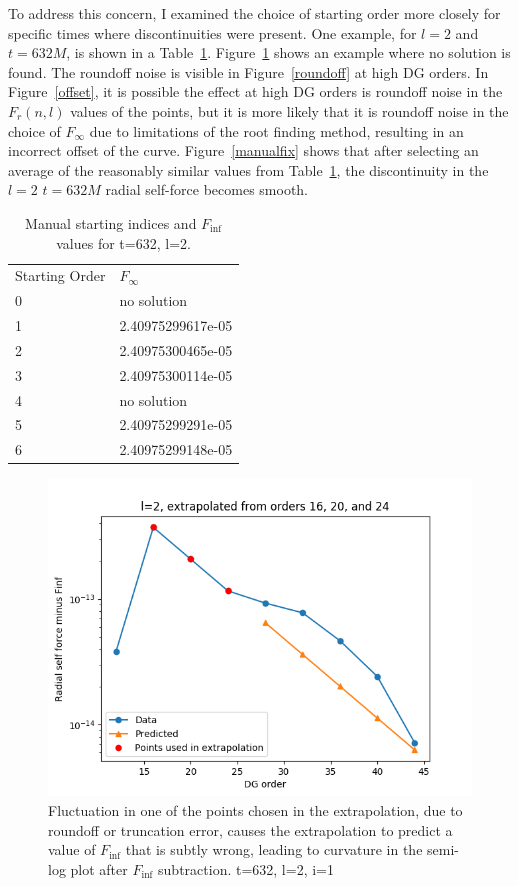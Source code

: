 To address this concern, I examined the choice of starting order more closely for specific times where discontinuities were present. One example, for $l=2$ and $t=632M$, is shown in a Table~\ref{manual}. Figure~\ref{nosoln} shows an example where no solution is found. The roundoff noise is visible in Figure~\ref{roundoff} at high DG orders. In Figure~\ref{offset}, it is possible the effect at high DG orders is roundoff noise in the $F_r(n,l)$ values of the points, but it is more likely that it is roundoff noise in the choice of $F_\infty$ due to limitations of the root finding method, resulting in an incorrect offset of the curve. Figure~\ref{manualfix} shows that after selecting an average of the reasonably similar values from Table~\ref{manual}, the discontinuity in the $l=2$ $t=632M$ radial self-force becomes smooth. 


\begin{table}
  \begin{tabular}{ll}
    Starting Order & $F_\infty$\\
    0 & no solution\\
    1 & 2.40975299617e-05\\
    2 & 2.40975300465e-05\\
    3 & 2.40975300114e-05\\
    4 & no solution\\
    5 & 2.40975299291e-05\\
    6 & 2.40975299148e-05\\
  \end{tabular}
  \caption{Manual starting indices and $F_{\inf}$ values for t=632, l=2.}
  \label{manual}
\end{table}

\begin{figure}
  \includegraphics{extrapolate7t632l2i1}
  \caption{Fluctuation in one of the points chosen in the extrapolation, due to roundoff or truncation error, causes the extrapolation to predict a value of $F_{\inf}$ that is subtly wrong, leading to curvature in the semi-log plot after $F_{\inf}$ subtraction. t=632, l=2, i=1}
  \label{nosoln}
\end{figure}

